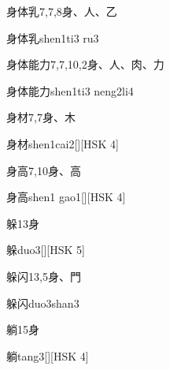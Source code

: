 \begin{entry}{身体乳}{7,7,8}{⾝、⼈、⼄}
  \begin{phonetics}{身体乳}{shen1ti3 ru3}
  \end{phonetics}
\end{entry}

\begin{entry}{身体能力}{7,7,10,2}{⾝、⼈、⾁、⼒}
  \begin{phonetics}{身体能力}{shen1ti3 neng2li4}
  \end{phonetics}
\end{entry}

\begin{entry}{身材}{7,7}{⾝、⽊}
  \begin{phonetics}{身材}{shen1cai2}[][HSK 4]
  \end{phonetics}
\end{entry}

\begin{entry}{身高}{7,10}{⾝、⾼}
  \begin{phonetics}{身高}{shen1 gao1}[][HSK 4]
  \end{phonetics}
\end{entry}

\begin{entry}{躲}{13}{⾝}
  \begin{phonetics}{躲}{duo3}[][HSK 5]
  \end{phonetics}
\end{entry}

\begin{entry}{躲闪}{13,5}{⾝、⾨}
  \begin{phonetics}{躲闪}{duo3shan3}
  \end{phonetics}
\end{entry}

\begin{entry}{躺}{15}{⾝}
  \begin{phonetics}{躺}{tang3}[][HSK 4]
  \end{phonetics}
\end{entry}



